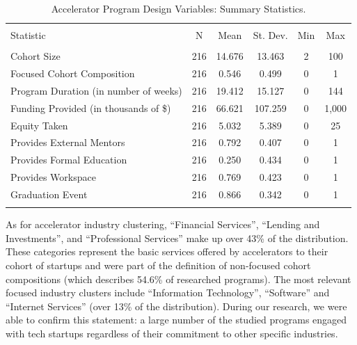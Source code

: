 \documentclass[
  12pt,
]{article}
\begin{document}
\begin{table}[H] \centering 
  \caption{Accelerator Program Design Variables: Summary Statistics.} 
  \label{tab:accvars} 
\scriptsize 
\begin{tabular}{@{\extracolsep{1pt}}lccccc} 
\\[-1.8ex]\hline 
\hline \\[-1.8ex] 
Statistic & \multicolumn{1}{c}{N} & \multicolumn{1}{c}{Mean} & \multicolumn{1}{c}{St. Dev.} & \multicolumn{1}{c}{Min} & \multicolumn{1}{c}{Max} \\ 
\hline \\[-1.8ex] 
Cohort Size & 216 & 14.676 & 13.463 & 2 & 100 \\ 
Focused Cohort Composition & 216 & 0.546 & 0.499 & 0 & 1 \\ 
Program Duration (in number of weeks) & 216 & 19.412 & 15.127 & 0 & 144 \\ 
Funding Provided (in thousands of \$) & 216 & 66.621 & 107.259 & 0 & 1,000 \\ 
Equity Taken & 216 & 5.032 & 5.389 & 0 & 25 \\ 
Provides External Mentors & 216 & 0.792 & 0.407 & 0 & 1 \\ 
Provides Formal Education & 216 & 0.250 & 0.434 & 0 & 1 \\ 
Provides Workspace & 216 & 0.769 & 0.423 & 0 & 1 \\ 
Graduation Event & 216 & 0.866 & 0.342 & 0 & 1 \\ 
\hline \\[-1.8ex] 
\end{tabular} 
\end{table}


As for accelerator industry clustering, ``Financial Services'', ``Lending and Investments'', and ``Professional Services'' make up over 43\% of the distribution. These categories represent the basic services offered by accelerators to their cohort of startups and were part of the definition of non-focused cohort compositions (which describes 54.6\% of researched programs). The most relevant focused industry clusters include ``Information Technology'', ``Software'' and ``Internet Services'' (over 13\% of the distribution). During our research, we were able to confirm this statement: a large number of the studied programs engaged with tech startups regardless of their commitment to other specific industries.
\end{document}
